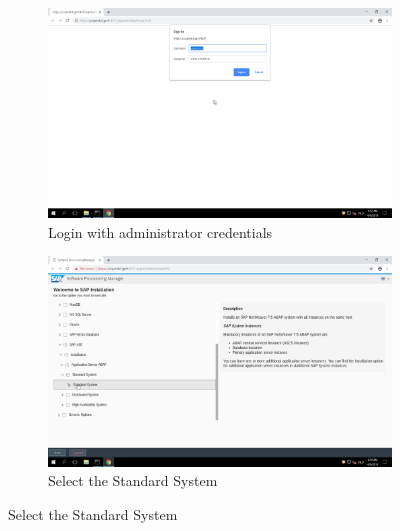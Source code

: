 \begin{figure}[!htb]\ContinuedFloat
    \begin{subfigure}{0.5\textwidth}
        \captionsetup{width=0.8\linewidth}
        \includegraphics[width=0.9\linewidth]{img/Methodologie/SAP36.png}
        \centering
        \caption{Login with administrator credentials}
    \end{subfigure}
    \begin{subfigure}{0.5\textwidth}
        \captionsetup{width=0.8\linewidth}
        \includegraphics[width=0.9\linewidth]{img/Methodologie/SAP35.png} 
        \centering
        \caption{Select the Standard System}
    \end{subfigure}
\end{figure}
